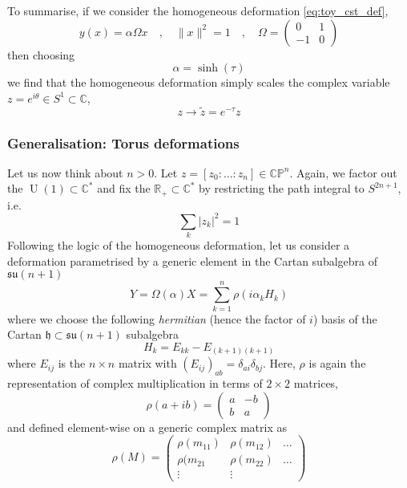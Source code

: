 \documentclass[a4paper,11pt]{article}
\theoremstyle{definition}
\newcommand{\RR}{\mathbb{R}}
\newcommand{\CC}{\mathbb{C}}
\newcommand{\CP}{\mathbb{CP}}
\DeclareMathOperator{\U}{U}
\newcommand{\h}{\mathfrak{h}}
\newcommand{\su}{\mathfrak{su}}
\newcommand{\mat}[4]{\begin{pmatrix} #1 & #2 \\ #3 & #4 \end{pmatrix}}
\begin{document}
To summarise, if we consider the homogeneous deformation \eqref{eq:toy_cst_def},
\begin{equation}
  y(x) = \alpha \Omega x \quad , \quad \lVert x \rVert^2 = 1 \quad , \quad \Omega = \mat{0}{1}{-1}{0}
\end{equation}
then choosing 
\begin{equation}
  \boxed{
    \alpha = \sinh(\tau)
  }
\end{equation}
we find that the homogeneous deformation simply scales the complex variable $z = e^{i\theta} \in S^1 \subset \CC$,
\begin{equation}
  z \to \tilde z = e^{-\tau} z
\end{equation}

\subsubsection{Generalisation: Torus deformations}\label{subsubsec:Torus_deformation}
Let us now think about $n > 0$. 
Let $z = [z_0:\dots:z_n] \in \CP^n$. 
Again, we factor out the $\U(1) \subset \CC^*$ and fix the $\RR_+ \subset \CC^*$ by restricting the path integral to $S^{2n +1}$, i.e.
\begin{equation}
  \sum_k \lvert z_k \rvert^2 = 1
\end{equation}
Following the logic of the homogeneous deformation, let us consider a deformation parametrised by a generic element in the Cartan subalgebra of $\su(n+1)$
\begin{equation}
  Y = \Omega(\alpha)X = \sum_{k=1}^{n} \rho(i \alpha_k H_k)
\end{equation}
where we choose the following \emph{hermitian} (hence the factor of $i$) basis of the Cartan $\h \subset \su(n+1)$ subalgebra
\begin{equation}
H_k = E_{kk} - E_{(k+1)(k+1)}
\end{equation}
where $E_{ij}$ is the $n \times n$ matrix with $(E_{ij})_{ab} = \delta_{ai}\delta_{bj}$.
Here, $\rho$ is again the representation of complex multiplication in terms of $2\times2$ matrices,
\begin{equation}
  \rho(a + ib) = \mat{a}{-b}{b}{a}
\end{equation}
and defined element-wise on a generic complex matrix as
\begin{equation}
  \rho(M) = 
  \begin{pmatrix} 
    \rho(m_{11}) & \rho(m_{12}) & \dots \\ 
    \rho(m_{21} & \rho(m_{22}) & \dots \\
     \vdots & \vdots & 
   \end{pmatrix}
\end{equation}
\end{document}
